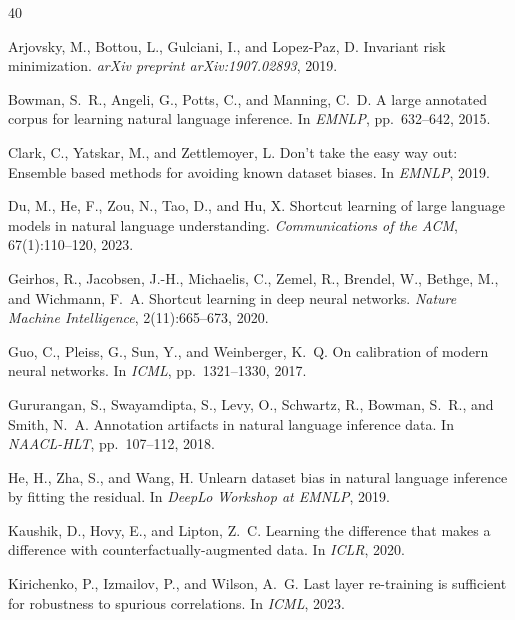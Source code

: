 \documentclass[10pt,twocolumn]{article}
\begin{document}
\begin{thebibliography}{40}

Arjovsky, M., Bottou, L., Gulciani, I., and Lopez-Paz, D.
\newblock Invariant risk minimization.
\newblock \emph{arXiv preprint arXiv:1907.02893}, 2019.

Bowman, S.~R., Angeli, G., Potts, C., and Manning, C.~D.
\newblock A large annotated corpus for learning natural language inference.
\newblock In \emph{EMNLP}, pp.\ 632--642, 2015.

Clark, C., Yatskar, M., and Zettlemoyer, L.
\newblock Don't take the easy way out: Ensemble based methods for avoiding known dataset biases.
\newblock In \emph{EMNLP}, 2019.

Du, M., He, F., Zou, N., Tao, D., and Hu, X.
\newblock Shortcut learning of large language models in natural language understanding.
\newblock \emph{Communications of the ACM}, 67(1):110--120, 2023.

Geirhos, R., Jacobsen, J.-H., Michaelis, C., Zemel, R., Brendel, W.,
  Bethge, M., and Wichmann, F.~A.
\newblock Shortcut learning in deep neural networks.
\newblock \emph{Nature Machine Intelligence}, 2(11):665--673, 2020.

Guo, C., Pleiss, G., Sun, Y., and Weinberger, K.~Q.
\newblock On calibration of modern neural networks.
\newblock In \emph{ICML}, pp.\ 1321--1330, 2017.

Gururangan, S., Swayamdipta, S., Levy, O., Schwartz, R., Bowman, S.~R.,
  and Smith, N.~A.
\newblock Annotation artifacts in natural language inference data.
\newblock In \emph{NAACL-HLT}, pp.\ 107--112, 2018.

He, H., Zha, S., and Wang, H.
\newblock Unlearn dataset bias in natural language inference by fitting the residual.
\newblock In \emph{DeepLo Workshop at EMNLP}, 2019.

Kaushik, D., Hovy, E., and Lipton, Z.~C.
\newblock Learning the difference that makes a difference with
  counterfactually-augmented data.
\newblock In \emph{ICLR}, 2020.

Kirichenko, P., Izmailov, P., and Wilson, A.~G.
\newblock Last layer re-training is sufficient for robustness to spurious correlations.
\newblock In \emph{ICML}, 2023.


\end{thebibliography}
\end{document}
